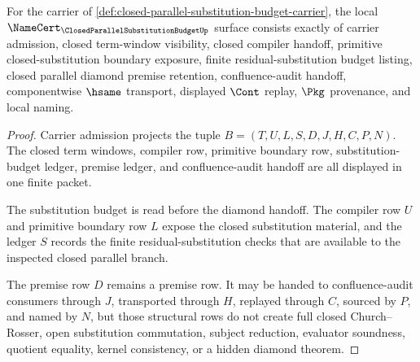 \begin{theorem}
\label{thm:closed-parallel-substitution-budget-obligations}
For the carrier of \autoref{def:closed-parallel-substitution-budget-carrier}, the local $\NameCert_{\ClosedParallelSubstitutionBudgetUp}$ surface consists exactly of carrier admission, closed term-window visibility, closed compiler handoff, primitive closed-substitution boundary exposure, finite residual-substitution budget listing, closed parallel diamond premise retention, confluence-audit handoff, componentwise $\hsame$ transport, displayed $\Cont$ replay, $\Pkg$ provenance, and local naming.
\end{theorem}
\begin{proof}
Carrier admission projects the tuple $B=(T,U,L,S,D,J,H,C,P,N)$. The closed term windows, compiler row, primitive boundary row, substitution-budget ledger, premise ledger, and confluence-audit handoff are all displayed in one finite packet.

The substitution budget is read before the diamond handoff. The compiler row $U$ and primitive boundary row $L$ expose the closed substitution material, and the ledger $S$ records the finite residual-substitution checks that are available to the inspected closed parallel branch.

The premise row $D$ remains a premise row. It may be handed to confluence-audit consumers through $J$, transported through $H$, replayed through $C$, sourced by $P$, and named by $N$, but those structural rows do not create full closed Church--Rosser, open substitution commutation, subject reduction, evaluator soundness, quotient equality, kernel consistency, or a hidden diamond theorem.
\end{proof}

